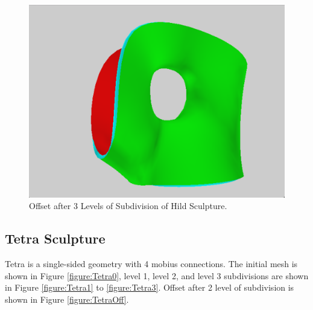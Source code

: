 \documentclass[12pt]{article}
\begin{document}
\begin{figure}[h!]
  \centering
    \includegraphics[width=\textwidth]{HildOff}
  \caption{Offset after 3 Levels of Subdivision of Hild Sculpture.} \label{figure:HildOff}
\end{figure}

\subsection{Tetra Sculpture}
Tetra is a single-sided geometry with 4 mobius connections. The initial mesh is shown in Figure \ref{figure:Tetra0}, level 1, level 2, and level 3 subdivisions are shown in Figure \ref{figure:Tetra1} to \ref{figure:Tetra3}. Offset after 2 level of subdivision is shown in Figure \ref{figure:TetraOff}.
\end{document}
